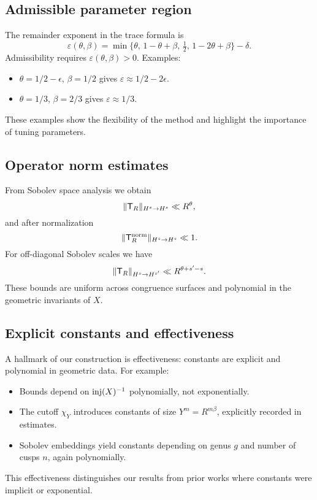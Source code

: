 \subsection{Admissible parameter region}\label{subsec:proj-parameters}

The remainder exponent in the trace formula is
\[
\varepsilon(\theta,\beta) = \min\{\theta,\,1-\theta+\beta,\,\tfrac12,\,1-2\theta+\beta\}-\delta.
\]
Admissibility requires $\varepsilon(\theta,\beta)>0$. Examples:
\begin{itemize}
\item $\theta=1/2-\epsilon$, $\beta=1/2$ gives $\varepsilon\approx 1/2-2\epsilon$.
\item $\theta=1/3$, $\beta=2/3$ gives $\varepsilon\approx 1/3$.
\end{itemize}
These examples show the flexibility of the method and highlight the importance of tuning parameters.

\subsection{Operator norm estimates}\label{subsec:proj-opnorm}

From Sobolev space analysis we obtain
\[
\|\mathsf{T}_R\|_{H^s\to H^s} \ll R^\theta,
\]
and after normalization
\[
\|\mathsf{T}_R^{\mathrm{norm}}\|_{H^s\to H^s} \ll 1.
\]
For off-diagonal Sobolev scales we have
\[
\|\mathsf{T}_R\|_{H^s\to H^{s'}} \ll R^{\theta+s'-s}.
\]
These bounds are uniform across congruence surfaces and polynomial in the geometric invariants of $X$.

\subsection{Explicit constants and effectiveness}\label{subsec:proj-constants}

A hallmark of our construction is effectiveness: constants are explicit and polynomial in geometric data. For example:
\begin{itemize}
\item Bounds depend on $\mathrm{inj}(X)^{-1}$ polynomially, not exponentially.
\item The cutoff $\chi_Y$ introduces constants of size $Y^m=R^{m\beta}$, explicitly recorded in estimates.
\item Sobolev embeddings yield constants depending on genus $g$ and number of cusps $n$, again polynomially.
\end{itemize}
This effectiveness distinguishes our results from prior works where constants were implicit or exponential.

